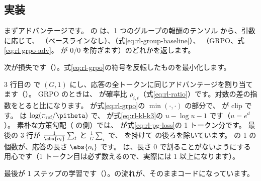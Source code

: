 \subsection{実装}

まずアドバンテージです。
 の  は、1 つのグループの報酬のテンソル  から、引数  に応じて、
（ベースラインなし）、（式\eqref{eq:rl-group-baseline}）、
（GRPO、式\eqref{eq:rl-grpo-adv}。 が $0/0$ を防ぎます）のどれかを返します。

次が損失です（）。式\eqref{eq:rl-grpo}の符号を反転したものを最小化します。


3 行目の  で $(G,1)$ にし、応答の全トークンに同じアドバンテージを割り当てます（）。
GRPO のときは、 が確率比 $\rho_{i,t}$（式\eqref{eq:rl-ratio}）です。対数の差の指数をとると比になります。
 が式\eqref{eq:rl-grpo}の $\min(\cdot,\cdot)$ の部分で、 が $\mathrm{clip}$ です。
 は $\log(\pi_{\text{ref}}/\pitheta)$ で、 が式\eqref{eq:rl-kl-k3}の $u-\log u-1$ です（$u=e^{d}$）。
素朴な方策勾配（ の側）では、 が式\eqref{eq:rl-pg-loss}の 1 トークン分です。
最後の 3 行が $\frac{1}{\abs{o_i}}\sum_t$ と $\frac{1}{G}\sum_i$ で、 を掛けて  の後ろを除いています。
 の 1 の個数が、応答の長さ $\abs{o_i}$ です。
 は、長さ 0 で割ることがないようにする用心です（1 トークン目は必ず数えるので、実際には 1 以上になります）。

最後が 1 ステップの学習です（）。の流れが、そのままコードになっています。


